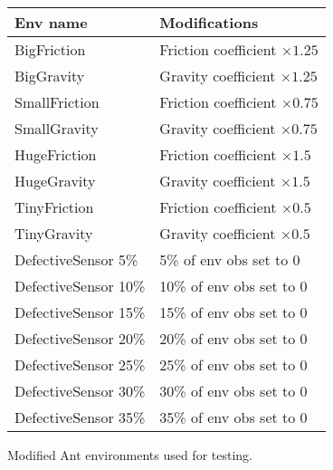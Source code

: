 
\begin{tabular}{l|l}
\textbf{Env name}&\textbf{Modifications} \\\midrule
BigFriction & Friction coefficient $\times 1.25$ \\
BigGravity& Gravity coefficient $\times 1.25$ \\
SmallFriction &Friction coefficient $\times 0.75$ \\
SmallGravity&Gravity coefficient $\times 0.75$ \\
HugeFriction & Friction coefficient $\times 1.5$ \\
HugeGravity &Gravity coefficient $\times 1.5$ \\
TinyFriction& Friction coefficient $\times 0.5$ \\
TinyGravity &Gravity coefficient $\times 0.5$ \\
DefectiveSensor 5\% & 5\% of env obs set to 0 \\
DefectiveSensor 10\% & 10\% of env obs set to 0 \\
DefectiveSensor 15\% & 15\% of env obs set to 0 \\
DefectiveSensor 20\% & 20\% of env obs set to 0 \\
DefectiveSensor 25\% & 25\% of env obs set to 0 \\
DefectiveSensor 30\% & 30\% of env obs set to 0 \\
DefectiveSensor 35\% & 35\% of env obs set to 0 \\
\hline
\end{tabular}
\caption{Modified Ant environments used for testing.}